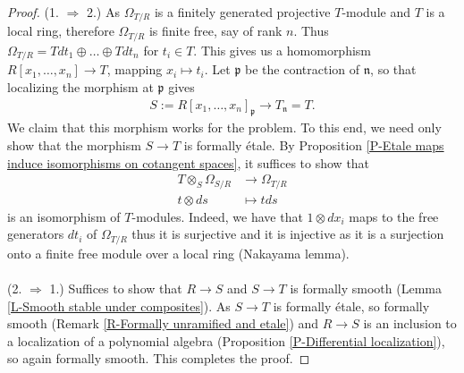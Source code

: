 \documentclass[letterpaper,10pt,twoside]{amsart}
\newcommand{\ideal}[1]{\mathfrak{#1}}
\newcommand{\tens}{\otimes}
\theoremstyle{proposition}
\theoremstyle{definition}
\theoremstyle{theorem}
\theoremstyle{definition}
\theoremstyle{definition}
\theoremstyle{definition}
\theoremstyle{lemma}
\theoremstyle{definition}
\theoremstyle{definition}
\theoremstyle{corollary}
\theoremstyle{definition}
\begin{document}
	\begin{proof}
		(1. $\Rightarrow$ 2.) As $\Omega_{T/R}$ is a finitely generated projective $T$-module and $T$ is a local ring, therefore $\Omega_{T/R}$ is finite free, say of rank $n$. Thus $\Omega_{T/R} = Tdt_1\oplus \dots \oplus Tdt_n$ for $t_i \in T$. This gives us a homomorphism $R[x_1,\dots,x_n] \longrightarrow T$, mapping $x_i \mapsto t_i$. Let $\ideal{p}$ be the contraction of $\ideal{n}$, so that localizing the morphism at $\ideal{p}$ gives
		\begin{align*}
			S:= R[x_1,\dots,x_n]_{\ideal{p}} \longrightarrow T_{\ideal{n}} = T.
		\end{align*}
		We claim that this morphism works for the problem. To this end, we need only show that the morphism $S\to T$ is formally \'etale. By Proposition \ref{P-Etale maps induce isomorphisms on cotangent spaces}, it suffices to show that 
		\begin{align*}
			T\tens_{S} \Omega_{S/R} &\longrightarrow \Omega_{T/R}\\
					t\tens ds &\longmapsto tds
		\end{align*}
		is an isomorphism of $T$-modules. Indeed, we have that $1\tens dx_i$ maps to the free generators $dt_i$ of $\Omega_{T/R}$ thus it is surjective and it is injective as it is a surjection onto a finite free module over a local ring (Nakayama lemma). \\\\
		(2. $\Rightarrow$ 1.) Suffices to show that $R\to S$ and $S\to T$ is formally smooth (Lemma \ref{L-Smooth stable under composites}). As $S\to T$ is formally \'etale, so formally smooth (Remark \ref{R-Formally unramified and etale}) and $R\to S$ is an inclusion to a localization of a polynomial algebra (Proposition \ref{P-Differential localization}), so again formally smooth. This completes the proof.
	\end{proof}
	
\end{document}
